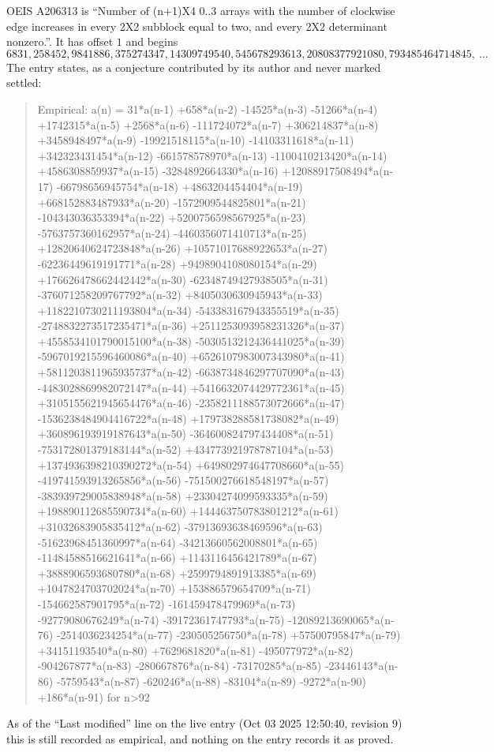 \documentclass[11pt,a4paper]{article}
\theoremstyle{plain}
\theoremstyle{definition}
\begin{document}
OEIS A206313 is ``Number of (n+1)X4 0..3 arrays with the number of clockwise edge increases in every 2X2 subblock equal to two, and every 2X2 determinant nonzero.''. It has offset $1$ and begins
\[
6831, 258452, 9841886, 375274347, 14309749540, 545678293613, 20808377921080, 793485464714845,\ \dots
\]
The entry states, as a conjecture contributed by its author and never marked settled:
\begin{quote}
Empirical: a(n) = 31*a(n-1) +658*a(n-2) -14525*a(n-3) -51266*a(n-4) +1742315*a(n-5) +2568*a(n-6) -111724072*a(n-7) +306214837*a(n-8) +3458948497*a(n-9) -19921518115*a(n-10) -14103311618*a(n-11) +342323431454*a(n-12) -661578578970*a(n-13) -1100410213420*a(n-14) +4586308859937*a(n-15) -3284892664330*a(n-16) +12088917508494*a(n-17) -66798656945754*a(n-18) +4863204454404*a(n-19) +668152883487933*a(n-20) -1572909544825801*a(n-21) -104343036353394*a(n-22) +5200756598567925*a(n-23) -5763757360162957*a(n-24) -4460356071410713*a(n-25) +12820640624723848*a(n-26) +10571017688922653*a(n-27) -62236449619191771*a(n-28) +9498904108080154*a(n-29) +176626478662442442*a(n-30) -62348749427938505*a(n-31) -376071258209767792*a(n-32) +8405030630945943*a(n-33) +1182210730211193804*a(n-34) -543383167943355519*a(n-35) -2748832273517235471*a(n-36) +2511253093958231326*a(n-37) +4558534101790015100*a(n-38) -5030513212436441025*a(n-39) -5967019215596460086*a(n-40) +6526107983007343980*a(n-41) +5811203811965935737*a(n-42) -6638734846297707090*a(n-43) -4483028869982072147*a(n-44) +5416632074429772361*a(n-45) +3105155621945654476*a(n-46) -2358211188573072666*a(n-47) -1536238484904416722*a(n-48) +179738288581738082*a(n-49) +360896193919187643*a(n-50) -364600824797434408*a(n-51) -753172801379183144*a(n-52) +434773921978787104*a(n-53) +1374936398210390272*a(n-54) +649802974647708660*a(n-55) -419741593913265856*a(n-56) -751500276618548197*a(n-57) -383939729005838948*a(n-58) +23304274099593335*a(n-59) +198890112685590734*a(n-60) +144463750783801212*a(n-61) +31032683905835412*a(n-62) -37913693638469596*a(n-63) -51623968451360997*a(n-64) -34213660562008801*a(n-65) -11484588516621641*a(n-66) +1143116456421789*a(n-67) +3888906593680780*a(n-68) +2599794891913385*a(n-69) +1047824703702024*a(n-70) +153886579654709*a(n-71) -154662587901795*a(n-72) -161459478479969*a(n-73) -92779080676249*a(n-74) -39172361747793*a(n-75) -12089213690065*a(n-76) -2514036234254*a(n-77) -230505256750*a(n-78) +57500795847*a(n-79) +34151193540*a(n-80) +7629681820*a(n-81) -495077972*a(n-82) -904267877*a(n-83) -280667876*a(n-84) -73170285*a(n-85) -23446143*a(n-86) -5759543*a(n-87) -620246*a(n-88) -83104*a(n-89) -9272*a(n-90) +186*a(n-91) for n>92
\end{quote}
As of the ``Last modified'' line on the live entry (Oct 03 2025 12:50:40, revision 9) this is still
recorded as empirical, and nothing on the entry records it as proved.
\end{document}
